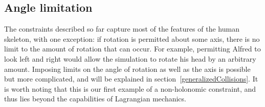 \subsection{Angle limitation\label{angleLimitation}}

The constraints described so far capture most of the features of the human skeleton, with one
exception: if rotation is permitted about some axis, there is no limit to the amount of rotation
that can occur. For example, permitting Alfred to look left and right would allow the simulation
to rotate his head by an arbitrary amount. Imposing
limits on the angle of rotation as well as the axis is possible but more complicated, and will
be explained in section~\ref{generalizedCollisions}. It is worth noting that this is our
first example of a non-holonomic constraint, and thus lies beyond the capabilities of Lagrangian
mechanics.
